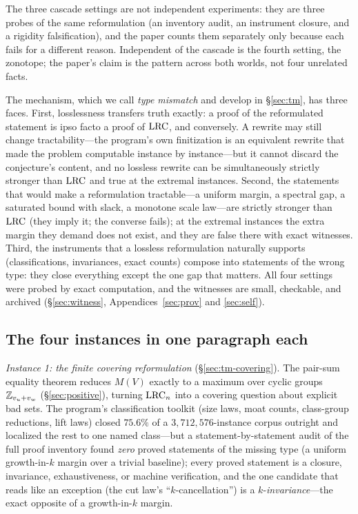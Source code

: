 The three cascade settings are not independent experiments: they are three
probes of the same reformulation (an inventory audit, an instrument
closure, and a rigidity falsification), and the paper counts them
separately only because each fails for a different reason. Independent of
the cascade is the fourth setting, the zonotope; the paper's claim is the
pattern across both worlds, not four unrelated facts.

The mechanism, which we call \emph{type mismatch} and develop in
\S\ref{sec:tm}, has three faces. First, losslessness transfers truth
exactly: a proof of the reformulated statement is ipso facto a proof of
$\mathrm{LRC}$, and conversely. A rewrite may still change tractability---the
program's own finitization is an equivalent rewrite that made the problem
computable instance by instance---but it cannot discard the conjecture's
content, and no lossless rewrite can be simultaneously strictly stronger
than $\mathrm{LRC}$ and true at the extremal instances. Second, the statements
that would make a reformulation tractable---a uniform margin, a spectral
gap, a saturated bound with slack, a monotone scale law---are strictly
stronger than $\mathrm{LRC}$ (they imply it; the converse fails); at the extremal
instances the extra margin they demand does not exist, and they are false
there with exact witnesses. Third, the instruments that a lossless
reformulation naturally supports (classifications, invariances, exact
counts) compose into statements of the wrong type: they close everything
except the one gap that matters. All four settings were probed by exact
computation, and the witnesses are small, checkable, and archived
(\S\ref{sec:witness}, Appendices~\ref{sec:prov} and \ref{sec:self}).

\subsection{The four instances in one paragraph each}

\emph{Instance 1: the finite covering reformulation}
(\S\ref{sec:tm-covering}). The pair-sum equality theorem reduces
$M(V)$ exactly to a maximum over cyclic groups $\mathbb{Z}_{v_u+v_w}$
(\S\ref{sec:positive}), turning $\mathrm{LRC}_n$ into a covering question about
explicit bad sets. The program's classification toolkit (size laws, moat
counts, class-group reductions, lift laws) closed $75.6\%$ of a
$3{,}712{,}576$-instance corpus outright and localized the rest to one
named class---but a statement-by-statement audit of the full proof
inventory found \emph{zero} proved statements of the missing type (a
uniform growth-in-$k$ margin over a trivial baseline); every proved
statement is a closure, invariance, exhaustiveness, or machine
verification, and the one candidate that reads like an exception (the cut
law's ``$k$-cancellation'') is a $k$-\emph{invariance}---the exact
opposite of a growth-in-$k$ margin.


